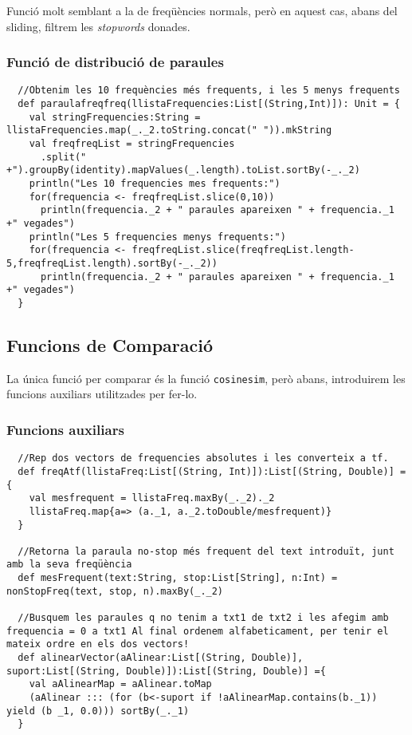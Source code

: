 \documentclass[11pt,a4paper,twoside]{report}
\begin{document}
Funció molt semblant a la de freqüències normals, però en aquest cas, abans del sliding, filtrem les \textit{stopwords} donades.

\subsubsection*{Funció de distribució de paraules}
\begin{lstlisting}
  //Obtenim les 10 frequències més frequents, i les 5 menys frequents
  def paraulafreqfreq(llistaFrequencies:List[(String,Int)]): Unit = {
    val stringFrequencies:String = llistaFrequencies.map(_._2.toString.concat(" ")).mkString
    val freqfreqList = stringFrequencies
      .split(" +").groupBy(identity).mapValues(_.length).toList.sortBy(-_._2)
    println("Les 10 frequencies mes frequents:")
    for(frequencia <- freqfreqList.slice(0,10))
      println(frequencia._2 + " paraules apareixen " + frequencia._1 +" vegades")
    println("Les 5 frequencies menys frequents:")
    for(frequencia <- freqfreqList.slice(freqfreqList.length-5,freqfreqList.length).sortBy(-_._2))
      println(frequencia._2 + " paraules apareixen " + frequencia._1 +" vegades")
  }
\end{lstlisting}

\subsection{Funcions de Comparació}

La única funció per comparar és la funció \texttt{cosinesim}, però abans, introduirem les funcions auxiliars utilitzades per fer-lo.

\subsubsection*{Funcions auxiliars}

\begin{lstlisting}
  //Rep dos vectors de frequencies absolutes i les converteix a tf.
  def freqAtf(llistaFreq:List[(String, Int)]):List[(String, Double)] = {
    val mesfrequent = llistaFreq.maxBy(_._2)._2
    llistaFreq.map{a=> (a._1, a._2.toDouble/mesfrequent)}
  }

  //Retorna la paraula no-stop més frequent del text introduït, junt amb la seva freqüència
  def mesFrequent(text:String, stop:List[String], n:Int) = nonStopFreq(text, stop, n).maxBy(_._2)

  //Busquem les paraules q no tenim a txt1 de txt2 i les afegim amb frequencia = 0 a txt1 Al final ordenem alfabeticament, per tenir el mateix ordre en els dos vectors!
  def alinearVector(aAlinear:List[(String, Double)], suport:List[(String, Double)]):List[(String, Double)] ={
    val aAlinearMap = aAlinear.toMap
    (aAlinear ::: (for (b<-suport if !aAlinearMap.contains(b._1)) yield (b _1, 0.0))) sortBy(_._1)
  }
\end{lstlisting}
\end{document}
